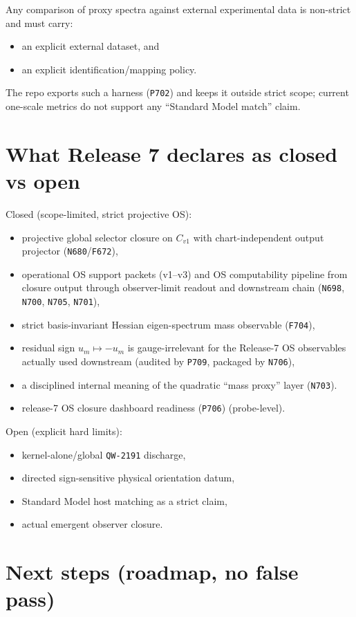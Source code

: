 \documentclass[11pt,a4paper]{article}
\begin{document}
Any comparison of proxy spectra against external experimental data is non-strict and must carry:
\begin{itemize}
  \item an explicit external dataset, and
  \item an explicit identification/mapping policy.
\end{itemize}
The repo exports such a harness (\texttt{P702}) and keeps it outside strict scope; current one-scale metrics do not support any “Standard Model match” claim.
\section{What Release 7 declares as closed vs open}

Closed (scope-limited, strict projective OS):
\begin{itemize}
  \item projective global selector closure on $C_{v1}$ with chart-independent output projector (\texttt{N680}/\texttt{F672}),
  \item operational OS support packets (v1--v3) and OS computability pipeline from closure output through observer-limit readout and downstream chain (\texttt{N698}, \texttt{N700}, \texttt{N705}, \texttt{N701}),
  \item strict basis-invariant Hessian eigen-spectrum mass observable (\texttt{F704}),
  \item residual sign $u_m\mapsto -u_m$ is gauge-irrelevant for the Release-7 OS observables actually used downstream (audited by \texttt{P709}, packaged by \texttt{N706}),
  \item a disciplined internal meaning of the quadratic “mass proxy” layer (\texttt{N703}).
  \item release-7 OS closure dashboard readiness (\texttt{P706}) (probe-level).
\end{itemize}

Open (explicit hard limits):
\begin{itemize}
  \item kernel-alone/global \texttt{QW-2191} discharge,
  \item directed sign-sensitive physical orientation datum,
  \item Standard Model host matching as a strict claim,
  \item actual emergent observer closure.
\end{itemize}

\section{Next steps (roadmap, no false pass)}
\end{document}
